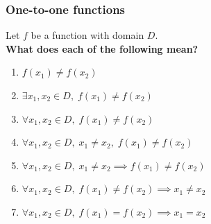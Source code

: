 \begin{frame}
	\frametitle{One-to-one functions}

	Let $f$ be a function with domain $D$. \\ {\bfseries What does each of the following mean?}
	\begin{enumerate}
		\item $\displaystyle f(x_{1}) \neq f(x_{2})$

		\item $\displaystyle \exists x_{1}, x_{2}\in D, \; f(x_{1}) \neq f(x_{2})$

		\item $\displaystyle \forall x_{1}, x_{2}\in D, \; f(x_{1}) \neq f(x_{2})$

		\item $\displaystyle \forall x_{1}, x_{2}\in D, \; x_{1}\neq x_{2}, \; f(x_{1}
			) \neq f(x_{2})$

		\item $\displaystyle \forall x_{1}, x_{2}\in D, \; x_{1}\neq x_{2}\implies f(
			x_{1}) \neq f(x_{2})$

		\item $\displaystyle \forall x_{1}, x_{2}\in D, \; f(x_{1}) \neq f(x_{2}) \implies
			x_{1}\neq x_{2}$

		\item $\displaystyle \forall x_{1}, x_{2}\in D, \; f(x_{1}) = f(x_{2}) \implies
			x_{1}= x_{2}$
	\end{enumerate}
\end{frame}

